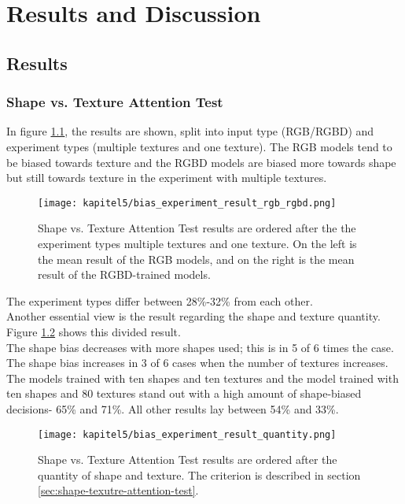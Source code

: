 \chapter{Results and Discussion}
\label{chap:kapitel5}

	\section{Results}
	\label{sec:results}
	
		\subsection{Shape vs. Texture Attention Test}
			In figure \ref{img:bias-result-input-type}, the results are shown, split into input type (RGB/RGBD) and experiment types (multiple textures and one texture). The RGB models tend to be biased towards texture and the RGBD models are biased more towards shape but still towards texture in the experiment with multiple textures.
			\begin{figure}[h]
				\centering
				\texttt{[image: kapitel5/bias\_experiment\_result\_rgb\_rgbd.png]}
				\caption[Shape vs. Texture Attention Test results are ordered after the the experiment types multiple textures and one texture. On the left is the mean result of the RGB models, and on the right is the mean result of the RGBD-trained models.]{Shape vs. Texture Attention Test results are ordered after the the experiment types multiple textures and one texture. On the left is the mean result of the RGB models, and on the right is the mean result of the RGBD-trained models.}
				\label{img:bias-result-input-type}
			\end{figure}
			The experiment types differ between 28\%-32\% from each other.\\
			Another essential view is the result regarding the shape and texture quantity. Figure \ref{img:bias-result-quantity-type} shows this divided result.\\
			The shape bias decreases with more shapes used; this is in 5 of 6 times the case. The shape bias increases in 3 of 6 cases when the number of textures increases. The models trained with ten shapes and ten textures and the model trained with ten shapes and 80 textures stand out with a high amount of shape-biased decisions- 65\% and 71\%. All other results lay between 54\% and 33\%.
			\begin{figure}[h]
				\centering
				\texttt{[image: kapitel5/bias\_experiment\_result\_quantity.png]}
				\caption[Shape vs. Texture Attention Test results are ordered after the quantity of shape and texture. The criterion is described in section \ref{sec:shape-texutre-attention-test}.]{Shape vs. Texture Attention Test results are ordered after the quantity of shape and texture. The criterion is described in section \ref{sec:shape-texutre-attention-test}.}
				\label{img:bias-result-quantity-type}
			\end{figure}
		
